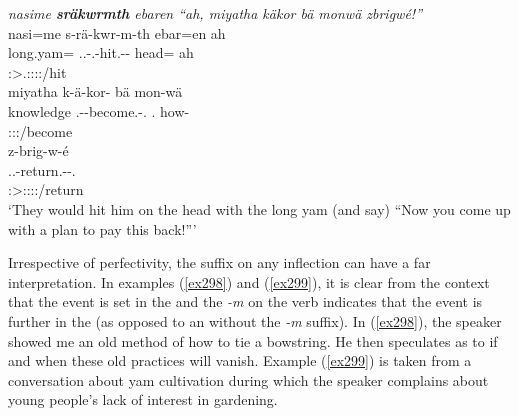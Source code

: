 \begin{exe}
	\ex \emph{nasime \textbf{sräkwrmth} ebaren ``ah, miyatha käkor bä monwä zbrigwé!''}\\
	\glll nasi=me s-rä-kwr-m-th ebar=en ah\\
	long.yam=\Ins{} \Tsg.\Masc.\Bet-\Irr.\Ndu-hit.\Rs-\Dur-\Stnsg{} head=\Loc{} ah\\
	{} \footnotesize{\Stpl:\Sbj>\Tsg.\Masc:\Obj:\Irr:\Pfv:\Bg/hit} {} {}\\
	\sn
	\glll miyatha k-ä-kor-\Zero{} bä mon-wä\\
	knowledge \M.\Bet-\Ndu-become.\Rs-\Ssg.\Imp{} \Second.\Abs{} how-\Emph{}\\
	{} \footnotesize{\Ssg:\Sbj:\Imp:\Pfv/become} {} {}\\
	\sn
	\glll z-brig-w-é\\
	\Tsg.\F.\Bet-return.\Ext-\Ndu-\Ssg.\Imp\\
	\footnotesize{\Ssg:\Sbj>\Tsg:\F:\Obj:\Imp:\Ipfv/return}\\
	\trans `They would hit him on the head with the long yam (and say) ``Now you come up with a plan to pay this back!''' 
	\label{ex297}
\end{exe}

Irrespective of perfectivity, the  suffix on any  inflection can have a far  interpretation. In examples (\ref{ex298}) and (\ref{ex299}), it is clear from the context that the event is set in the  and the \emph{-m} on the verb indicates that the event is further in the  (as opposed to an  without the \emph{-m} suffix). In (\ref{ex298}), the speaker showed me an old method of how to tie a bowstring. He then speculates as to if and when these old practices will vanish. Example (\ref{ex299}) is taken from a conversation about yam cultivation during which the speaker complains about young people's lack of interest in gardening.

